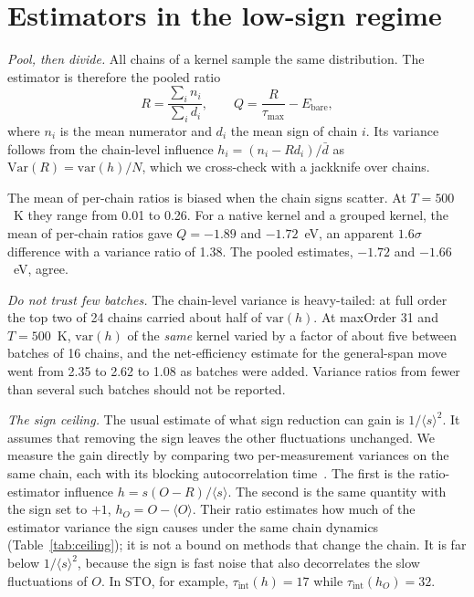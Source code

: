 \documentclass[aps,prb,reprint,superscriptaddress,nofootinbib]{revtex4-2}
\newcommand{\avg}[1]{\langle #1\rangle}
\newcommand{\tauint}{\tau_{\mathrm{int}}}
\begin{document}
\section{Estimators in the low-sign regime}
\label{sec:estimators}

\emph{Pool, then divide.} All chains of a kernel sample the same distribution. The estimator is therefore the pooled ratio
\begin{equation}
R=\frac{\sum_i n_i}{\sum_i d_i},\qquad Q=\frac{R}{\tau_{\max}}-E_{\mathrm{bare}},
\end{equation}
where $n_i$ is the mean numerator and $d_i$ the mean sign of chain $i$. Its variance follows from the chain-level influence $h_i=(n_i-Rd_i)/\bar d$ as $\mathrm{Var}(R)=\mathrm{var}(h)/N$, which we cross-check with a jackknife over chains.

The mean of per-chain ratios is biased when the chain signs scatter. At $T=500$~K they range from 0.01 to 0.26. For a native kernel and a grouped kernel, the mean of per-chain ratios gave $Q=-1.89$ and $-1.72$~eV, an apparent $1.6\sigma$ difference with a variance ratio of 1.38. The pooled estimates, $-1.72$ and $-1.66$~eV, agree.

\emph{Do not trust few batches.} The chain-level variance is heavy-tailed: at full order the top two of 24 chains carried about half of $\mathrm{var}(h)$. At maxOrder 31 and $T=500$~K, $\mathrm{var}(h)$ of the \emph{same} kernel varied by a factor of about five between batches of 16 chains, and the net-efficiency estimate for the general-span move went from 2.35 to 2.62 to 1.08 as batches were added. Variance ratios from fewer than several such batches should not be reported.

\emph{The sign ceiling.} The usual estimate of what sign reduction can gain is $1/\avg{s}^2$. It assumes that removing the sign leaves the other fluctuations unchanged. We measure the gain directly by comparing two per-measurement variances on the same chain, each with its blocking autocorrelation time~\cite{FlyvbjergPetersen1989,Sokal1997}. The first is the ratio-estimator influence $h=s(O-R)/\avg{s}$. The second is the same quantity with the sign set to $+1$, $h_O=O-\avg{O}$. Their ratio estimates how much of the estimator variance the sign causes under the same chain dynamics (Table~\ref{tab:ceiling}); it is not a bound on methods that change the chain. It is far below $1/\avg{s}^2$, because the sign is fast noise that also decorrelates the slow fluctuations of $O$. In STO, for example, $\tauint(h)=17$ while $\tauint(h_O)=32$.
\end{document}

